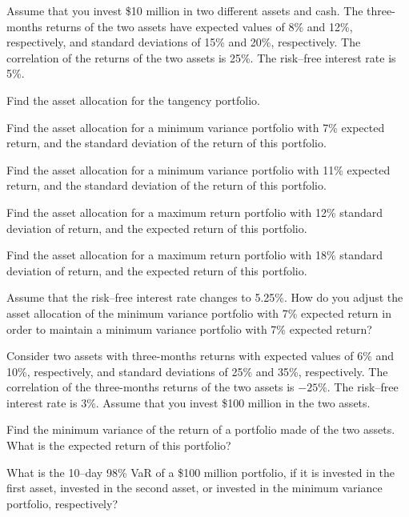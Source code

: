 \begin{exercises}
\item Assume that you invest \$10 million in two different assets and cash.
The three-months returns of the two assets have expected values of 8\% and
12\%, respectively, and standard deviations of 15\% and 20\%, respectively.
The correlation of the returns of the two assets is 25\%. The risk--free
interest rate is 5\%.
\begin{subparts}
\item Find the asset allocation for the tangency portfolio.
\item Find the asset allocation for a minimum variance portfolio with 7\%
expected return, and the standard deviation of the return of this portfolio.
\item Find the asset allocation for a minimum variance portfolio with 11\%
expected return, and the standard deviation of the return of this portfolio.
\item Find the asset allocation for a maximum return portfolio with 12\%
standard deviation of return, and the expected return of this portfolio.
\item Find the asset allocation for a maximum return portfolio with 18\%
standard deviation of return, and the expected return of this portfolio.
\item Assume that the risk--free interest rate changes to 5.25\%. How do you
adjust the asset allocation of the minimum variance portfolio with 7\%
expected return in order to maintain a minimum variance portfolio with 7\%
expected return?
\end{subparts}

\item Consider two assets with three-months returns with expected values of
6\% and 10\%, respectively, and standard deviations of 25\% and 35\%,
respectively. The correlation of the three-months returns of the two assets
is $-25\%$. The risk--free interest rate is 3\%. Assume that you invest \$100
million in the two assets.
\begin{subparts}
\item Find the minimum variance of the return of a portfolio made of the two
assets. What is the expected return of this portfolio?
\item What is the 10--day 98\% VaR of a \$100 million portfolio, if it is
invested in the first asset, invested in the second asset, or invested in
the minimum variance portfolio, respectively?
\end{subparts}


\end{exercises}

